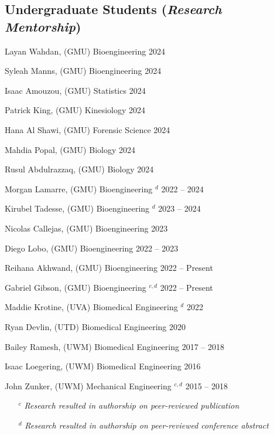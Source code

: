 \documentclass[letterpaper, 10pt]{article}
\begin{document}
\subsection{\textbf{Undergraduate Students} (\textit{Research Mentorship})}
\begin{compacthang}
     \item Layan Wahdan, (GMU) Bioengineering \hfill 2024
     \item Syleah Manns, (GMU) Bioengineering \hfill 2024
     \item Isaac Amouzou, (GMU) Statistics \hfill 2024
     \item Patrick King, (GMU) Kinesiology \hfill 2024
     \item Hana Al Shawi, (GMU) Forensic Science \hfill 2024
     \item Mahdia Popal, (GMU) Biology \hfill 2024
     \item Rusul Abdulrazzaq, (GMU) Biology \hfill 2024
     \item Morgan Lamarre, (GMU) Bioengineering $^{d}$ \hfill 2022 -- 2024
	\item Kirubel Tadesse, (GMU) Bioengineering $^{d}$ \hfill 2023 -- 2024
	\item Nicolas Callejas, (GMU) Bioengineering \hfill 2023
	\item Diego Lobo, (GMU) Bioengineering  \hfill 2022 -- 2023
     \item Reihana Akhwand, (GMU) Bioengineering \hfill 2022 -- Present
	\item Gabriel Gibson, (GMU) Bioengineering $^{c,d}$ \hfill 2022 -- Present
	\item Maddie Krotine, (UVA) Biomedical Engineering $^{d}$ \hfill 2022
	\item Ryan Devlin, (UTD) Biomedical Engineering \hfill 2020
	\item Bailey Ramesh, (UWM) Biomedical Engineering \hfill 2017 -- 2018
	\item Isaac Loegering, (UWM) Biomedical Engineering \hfill 2016
	\item John Zunker, (UWM) Mechanical Engineering $^{c,d}$ \hfill 2015 -- 2018 
     \begin{itemize}
	     \item[$^{c}$] \textit{Research resulted in authorship on peer-reviewed publication}
	     \item[$^{d}$] \textit{Research resulted in authorship on peer-reviewed conference abstract}
     \end{itemize}	
\end{compacthang}
\end{document}

